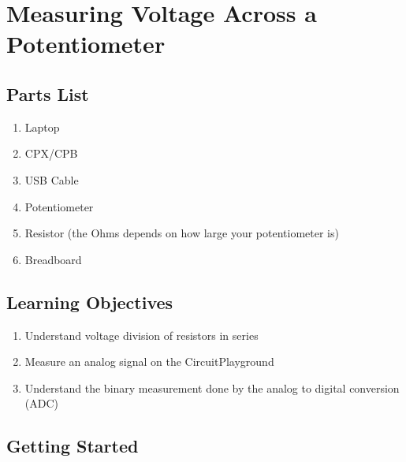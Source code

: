 \newpage

\section{Measuring Voltage Across a Potentiometer}

\subsection{Parts List}

\begin{enumerate}[itemsep=-5pt]
\item Laptop
\item CPX/CPB
\item USB Cable
\item Potentiometer
\item Resistor (the Ohms depends on how large your potentiometer is)
\item Breadboard
\end{enumerate}

\subsection{Learning Objectives}
\begin{enumerate}[itemsep=-5pt]
\item Understand voltage division of resistors in series
\item Measure an analog signal on the CircuitPlayground
\item Understand the binary measurement done by the analog to digital conversion (ADC)
\end{enumerate}

\subsection{Getting Started}

